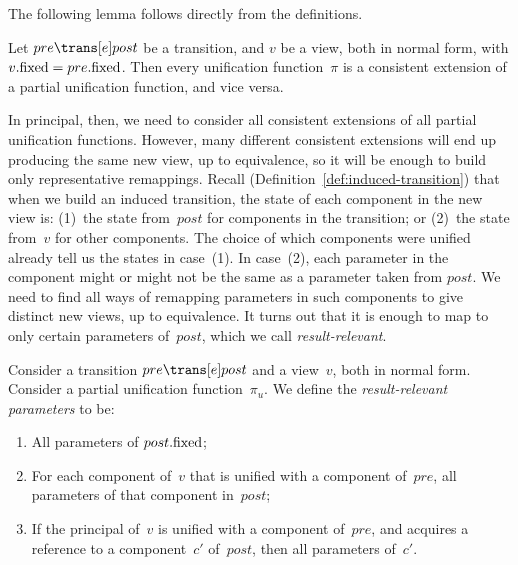 
The following lemma follows directly from the definitions.
%
\begin{lemma}
Let $pre \trans[e] post$ be a transition, and $v$ be a view, both in normal
form, with $v.\mathrm{fixed} = pre.\mathrm{fixed}$.  Then every unification function~$\pi$ is
a consistent extension of a partial unification function, and vice versa.
\end{lemma}

In principal, then, we need to consider all consistent extensions of all
partial unification functions.  However, many different consistent extensions
will end up producing the same new view, up to equivalence, so it will be
enough to build only representative remappings.  Recall
(Definition~\ref{def:induced-transition}) that when we build an induced
transition, the state of each component in the new view is: (1)~the state
from~$post$ for components in the transition; or (2)~the state from~$v$ for
other components.  The choice of which components were unified already tell us
the states in case~(1).  In case~(2), each parameter in the component might or
might not be the same as a parameter taken from $post$.  We need to find all
ways of remapping parameters in such components to give distinct new views, up
to equivalence.  It turns out that it is enough to map to only certain
parameters of~$post$, which we call \emph{result-relevant}.
%
\begin{definition}
\label{def:result-relevant}
Consider a transition $pre \trans[e] post$ and a view~$v$, both in normal form.
Consider a partial unification function~$\pi_u$.  We define the
\emph{result-relevant parameters} to be:
%
\begin{enumerate}
\item\label{clause:result-relevant-1} All parameters of $post.\mathrm{fixed}$;

\item\label{clause:result-relevant-2} For each component of~$v$ that is
  unified with a component of~$pre$, all parameters of that component
  in~$post$;

\item\label{clause:result-relevant-3} If the principal of~$v$ is unified with
  a component of~$pre$, and acquires a reference to a component~$c'$
  of~$post$, then all parameters of~$c'$.
\end{enumerate}
\end{definition}


